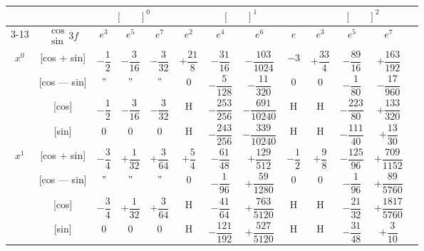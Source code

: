 \documentclass[11pt,a4paper]{book}
\begin{document}
\newpage


\begin{center}
\small
\begin{tabular}{|c|c|c|c|c|c|c|c|c|c|c|c|c|}
\hline
& & \multicolumn{3}{c|}{$[\phantom{()}]^0$} & \multicolumn{4}{c|}{$[\phantom{()}]^1$} & \multicolumn{4}{c|}{$[\phantom{()}]^2$} \\
\cline{3-13}
& $\begin{smallmatrix} \cos \\ \sin \end{smallmatrix} 3f$ & $e^3$ & $e^5$ & $e^7$ & $e^2$ & $e^4$ & $e^6$ & $e$ & $e^3$ & $e^5$ & $e^7$ \\
\hline
\multirow{4}{*}{$x^0$} & [cos + sin] & $-\dfrac{1}{2}$ & $-\dfrac{3}{16}$ & $-\dfrac{3}{32}$ & $+\dfrac{21}{8}$ & $-\dfrac{31}{16}$ & $-\dfrac{103}{1024}$ & $-3$ & $+\dfrac{33}{4}$ & $-\dfrac{89}{16}$ & $+\dfrac{163}{192}$ \\
& [cos --- sin] & $"$ & $"$ & $"$ & $0$ & $-\dfrac{5}{128}$ & $-\dfrac{11}{320}$ & $0$ & $0$ & $-\dfrac{1}{80}$ & $-\dfrac{17}{960}$ \\
& [cos] & $-\dfrac{1}{2}$ & $-\dfrac{3}{16}$ & $-\dfrac{3}{32}$ & H & $-\dfrac{253}{256}$ & $-\dfrac{691}{10240}$ & H & H & $-\dfrac{223}{80}$ & $+\dfrac{133}{320}$ \\
& [sin] & $0$ & $0$ & $0$ & H & $-\dfrac{243}{256}$ & $-\dfrac{339}{10240}$ & H & H & $-\dfrac{111}{40}$ & $+\dfrac{13}{30}$ \\
\hline
\multirow{4}{*}{$x^1$} & [cos + sin] & $-\dfrac{3}{4}$ & $+\dfrac{1}{32}$ & $+\dfrac{3}{64}$ & $+\dfrac{5}{4}$ & $-\dfrac{61}{48}$ & $+\dfrac{129}{512}$ & $-\dfrac{1}{2}$ & $+\dfrac{9}{8}$ & $-\dfrac{125}{96}$ & $+\dfrac{709}{1152}$ \\
& [cos --- sin] & $"$ & $"$ & $"$ & $0$ & $-\dfrac{1}{96}$ & $+\dfrac{59}{1280}$ & $0$ & $0$ & $-\dfrac{1}{96}$ & $+\dfrac{89}{5760}$ \\
& [cos] & $-\dfrac{3}{4}$ & $+\dfrac{1}{32}$ & $+\dfrac{3}{64}$ & H & $-\dfrac{41}{64}$ & $+\dfrac{763}{5120}$ & H & H & $-\dfrac{21}{32}$ & $+\dfrac{1817}{5760}$ \\
& [sin] & $0$ & $0$ & $0$ & H & $-\dfrac{121}{192}$ & $+\dfrac{527}{5120}$ & H & H & $-\dfrac{31}{48}$ & $+\dfrac{3}{10}$ \\

\end{tabular}
\end{center}
\end{document}
